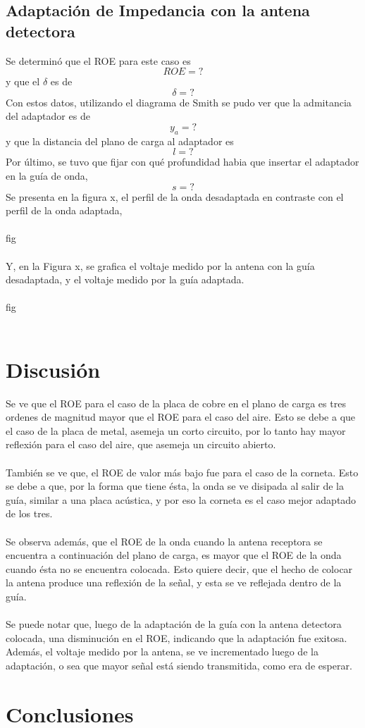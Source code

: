 \documentclass[11pt,a4paper]{article}
\begin{document}
\begin{multicols}{2}
\subsection{Adaptación de Impedancia con la antena detectora}
Se determinó que el ROE para este caso es
$$
ROE = ?
$$
y que el $\delta$ es de
$$
\delta = ?
$$
Con estos datos, utilizando el diagrama de Smith se pudo ver que la admitancia del adaptador es de
$$
y_a = ?
$$
y que la distancia del plano de carga al adaptador es
$$
l = ?
$$
Por último, se tuvo que fijar con qué profundidad habia que insertar el adaptador en la guía de onda,
$$
s = ?
$$
Se presenta en la figura x, el perfil de la onda desadaptada en contraste con el perfil de la onda adaptada,
\\ \\
fig 
\\ \\
Y, en la Figura x, se grafica el voltaje medido por la antena con la guía desadaptada, y el voltaje medido por la guía adaptada.
\\ \\
fig
\\ \\
\section{Discusión}
Se ve que el ROE para el caso de la placa de cobre en el plano de carga es tres ordenes de magnitud mayor que el ROE para el caso del aire. Esto se debe a que el caso de la placa de metal, asemeja un corto circuito, por lo tanto hay mayor reflexión para el caso del aire, que asemeja un circuito abierto. \\ \\
También se ve que, el ROE de valor más bajo fue para el caso de la corneta. Esto se debe a que, por la forma que tiene ésta, la onda se ve disipada al salir de la guía, similar a una placa acústica, y por eso la corneta es el caso mejor adaptado de los tres. \\ \\
Se observa además, que el ROE de la onda cuando la antena receptora se encuentra a continuación del plano de carga, es mayor que el ROE de la onda cuando ésta no se encuentra colocada. Esto quiere decir, que el hecho de colocar la antena produce una reflexión de la señal, y esta se ve reflejada dentro de la guía. \\ \\
Se puede notar que, luego de la adaptación de la guía con la antena detectora colocada, una disminución en el ROE, indicando que la adaptación fue exitosa. Además, el voltaje medido por la antena, se ve incrementado luego de la adaptación, o sea que mayor señal está siendo transmitida, como era de esperar.
\section{Conclusiones}




\end{multicols}
\end{document}
